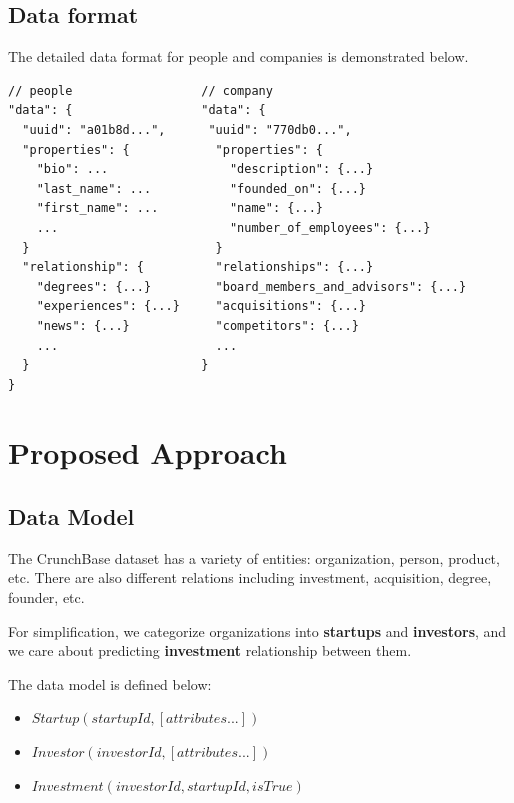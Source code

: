 \subsection{Data format}\label{data-format}

The detailed data format for people and companies is demonstrated below.

\small

\begin{verbatim}
// people                  // company
"data": {                  "data": {           
  "uuid": "a01b8d...",      "uuid": "770db0...",                         
  "properties": {            "properties": {                   
    "bio": ...                 "description": {...}                
    "last_name": ...           "founded_on": {...}                      
    "first_name": ...          "name": {...}                       
    ...                        "number_of_employees": {...}
  }                          }     
  "relationship": {          "relationships": {...}                     
    "degrees": {...}         "board_members_and_advisors": {...}
    "experiences": {...}     "acquisitions": {...}                          
    "news": {...}            "competitors": {...}                   
    ...                      ...         
  }                        }     
}                          
\end{verbatim}

\normalsize

\section{Proposed Approach}\label{proposed-approach}

\subsection{Data Model}\label{data-model}

The CrunchBase dataset has a variety of entities: organization, person,
product, etc. There are also different relations including investment,
acquisition, degree, founder, etc.

For simplification, we categorize organizations into \textbf{startups}
and \textbf{investors}, and we care about predicting \textbf{investment}
relationship between them.

The data model is defined below:

\begin{itemize}
\itemsep1pt\parskip0pt
\item
  \(Startup(startupId, [attributes...])\)
\item
  \(Investor(investorId, [attributes...])\)
\item
  \(Investment(investorId, startupId, isTrue)\)
\end{itemize}

